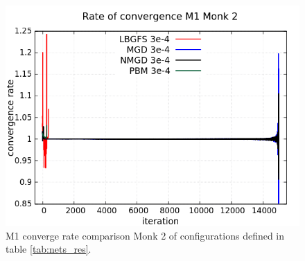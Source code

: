 \begin{figure}[H]
	\centering
	\includegraphics[width=0.6\linewidth]{data/Comparison/Monk2/Monk2_M1_CR_standard.png}
	\caption{M1 converge rate comparison Monk 2 of configurations defined in table \ref{tab:nets_res}.}
	\label{fig:CR-M1-Monk2-Standard}
\end{figure}


